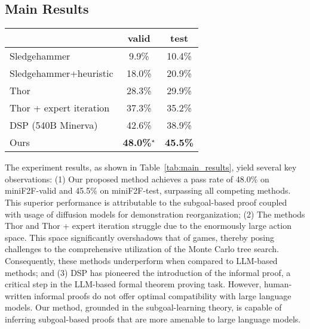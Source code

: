 \documentclass{article}
\begin{document}
\subsection{Main Results}



\begin{table*}[t!]
\centering
\caption{Pass rates on the miniF2F dataset with Isabelle. Numbers in bold denote the best performance. Numbers with a $\star$ correspond to the cumulative pass rate~\cite{lample2022hypertree} since the evaluated statements are part of the training for diffusion models. See \S\ref{sec:evaluation} for more details about cumulative pass rate.}
\label{tab:main_results}
\begin{tabular}{lcc}
\toprule
\multicolumn{1}{c}{\textbf{}} & valid   & test    \\ \midrule
Sledgehammer                  & 9.9\%           & 10.4\%          \\
Sledgehammer+heuristic        & 18.0\%          & 20.9\%          \\
Thor                          & 28.3\%          & 29.9\%          \\
Thor + expert iteration       & 37.3\%          & 35.2\%          \\ 
DSP (540B Minerva)            & 42.6\%          & 38.9\%          \\ \midrule
Ours                          & \textbf{48.0\%}$^{\star}$ & \textbf{45.5\%} \\
\bottomrule
\end{tabular}
\end{table*}

The experiment results, as shown in Table~\ref{tab:main_results}, yield several key observations: (1) Our proposed method achieves a pass rate of 48.0\% on miniF2F-valid and 45.5\% on miniF2F-test, surpassing all competing methods. This superior performance is attributable to the subgoal-based proof coupled with usage of diffusion models for demonstration reorganization; (2) The methods Thor and Thor + expert iteration struggle due to the enormously large action space. This space significantly overshadows that of games, thereby posing challenges to the comprehensive utilization of the Monte Carlo tree search.  Consequently, these methods underperform when compared to LLM-based methods; and (3) DSP has pioneered the introduction of the informal proof, a critical step in the LLM-based formal theorem proving task. However, human-written informal proofs do not offer optimal compatibility with large language models. Our method, grounded in the subgoal-learning theory, is capable of inferring subgoal-based proofs that are more amenable to large language models.
\end{document}
